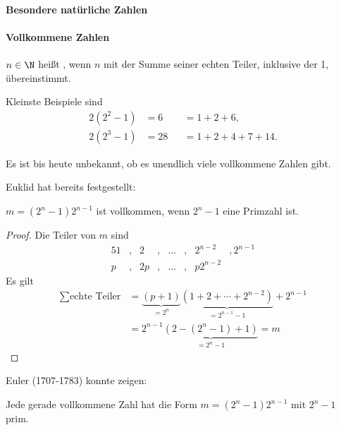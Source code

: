 \paragraph{Besondere natürliche Zahlen}

\paragraph{Vollkommene Zahlen}

\begin{df}
	$n \in \N$ heißt , wenn $n$ mit der Summe seiner echten Teiler, inklusive der 1, übereinstimmt.
\end{df}

\begin{ex}
	Kleinste Beispiele sind
	\begin{align*}
		2(2^2 - 1) &= 6  &&= 1 + 2 + 6, \\
		2(2^3 - 1) &= 28 &&= 1 + 2 + 4 + 7 + 14.
	\end{align*}
\end{ex}

Es ist bis heute unbekannt, ob es unendlich viele vollkommene Zahlen gibt.


Euklid hat bereits festgestellt:

\begin{st}[Euklid]
	$m = (2^n - 1) 2^{n-1}$ ist vollkommen, wenn $2^n - 1$ eine Primzahl ist.
	\begin{proof}
		Die Teiler von $m$ sind
		\begin{alignat*}{5}
			1&,& 2 &,& \dotsc&,& 2^{n-2} &, 2^{n-1} \\
			p&,& 2p&,& \dotsc&,& p2^{n-2}
		\end{alignat*}
		Es gilt
		\begin{align*}
			\sum \text{echte Teiler}
			&= \underbrace{(p + 1)}_{=2^n} \underbrace{(1 + 2 + \dotsb + 2^{n-2})}_{=2^{n-1} - 1} + 2^{n-1} \\
			&= 2^{n-1} \underbrace{(2 - (2^n-1) + 1)}_{=2^n-1}
			= m
		\end{align*}
	\end{proof}
\end{st}

Euler (1707-1783) konnte zeigen:

\begin{st}
	Jede gerade vollkommene Zahl hat die Form $m = (2^n-1) 2^{n-1}$ mit $2^n - 1$ prim.
\end{st}


